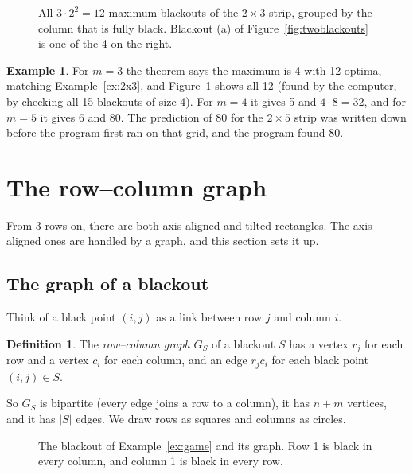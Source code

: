 \documentclass[11pt]{article}
\theoremstyle{definition}
\newtheorem{definition}[theorem]{Definition}
\newtheorem{example}[theorem]{Example}
\theoremstyle{remark}
\begin{document}
\begin{figure}[htbp]
\centering

\caption{All $3\cdot2^2=12$ maximum blackouts of the $2\times3$ strip, grouped by the column that
is fully black. Blackout (a) of Figure~\ref{fig:twoblackouts} is one of the 4 on the right.}
\label{fig:stripall}
\end{figure}

\begin{example}
For $m=3$ the theorem says the maximum is 4 with 12 optima, matching Example~\ref{ex:2x3}, and
Figure~\ref{fig:stripall} shows all 12 (found by the computer, by checking all 15 blackouts of
size 4). For $m=4$ it gives 5 and $4\cdot8=32$, and for $m=5$ it gives 6 and 80. The prediction of
80 for the $2\times5$ strip was written down before the program first ran on that grid, and the
program found 80.
\end{example}

\section{The row--column graph}\label{sec:graph}

From 3 rows on, there are both axis-aligned and tilted rectangles. The axis-aligned ones are
handled by a graph, and this section sets it up.

\subsection{The graph of a blackout}

Think of a black point $(i,j)$ as a link between row $j$ and column $i$.

\begin{definition}
The \emph{row--column graph} $G_S$ of a blackout $S$ has a vertex $r_j$ for each row and a
vertex $c_i$ for each column, and an edge $r_jc_i$ for each black point $(i,j)\in S$.
\end{definition}

So $G_S$ is bipartite (every edge joins a row to a column), it has $n+m$ vertices, and it has
$|S|$ edges. We draw rows as squares and columns as circles.

\begin{figure}[htbp]
\centering

\caption{The blackout of Example~\ref{ex:game} and its graph. Row 1 is black in every column,
and column 1 is black in every row.}
\label{fig:incidence}
\end{figure}
\end{document}

